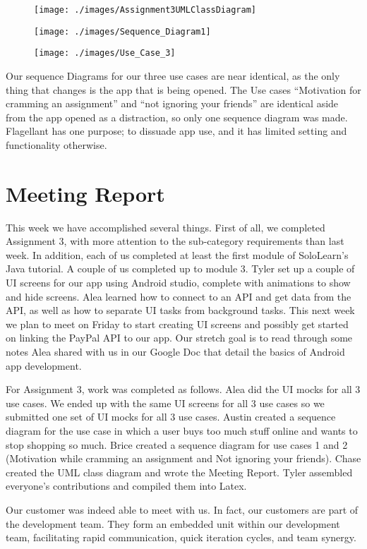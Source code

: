 \documentclass[a4paper]{article}
\begin{document}
\begin{figure}[H]
	\centering
	\texttt{[image: ./images/Assignment3UMLClassDiagram]}
\end{figure}

\begin{figure}[H]
	\centering
	\texttt{[image: ./images/Sequence\_Diagram1]}
\end{figure}

\begin{figure}[H]
	\centering
	\texttt{[image: ./images/Use\_Case\_3]}
\end{figure}

Our sequence Diagrams for our three use cases are near identical, as the only thing that changes is the app that is being opened.  The Use cases “Motivation for cramming an assignment” and “not ignoring your friends” are identical aside from the app opened as a distraction, so only one sequence diagram was made.  Flagellant has one purpose; to dissuade app use, and it has limited setting and functionality otherwise.

\pagebreak    
\section{Meeting Report}

	This week we have accomplished several things. First of all, we completed Assignment 3, with more attention to the sub-category requirements than last week. In addition, each of us completed at least the first module of SoloLearn’s Java tutorial. A couple of us completed up to module 3. Tyler set up a couple of UI screens for our app using Android studio, complete with animations to show and hide screens. Alea learned how to connect to an API and get data from the API, as well as how to separate UI tasks from background tasks.
	This next week we plan to meet on Friday to start creating UI screens and possibly get started on linking the PayPal API to our app. Our stretch goal is to read through some notes Alea shared with us in our Google Doc that detail the basics of Android app development.
    
	For Assignment 3, work was completed as follows. Alea did the UI mocks for all 3 use cases. We ended up with the same UI screens for all 3 use cases so we submitted one set of UI mocks for all 3 use cases. Austin created a sequence diagram for the use case in which a user buys too much stuff online and wants to stop shopping so much. Brice created a sequence diagram for use cases 1 and 2 (Motivation while cramming an assignment and Not ignoring your friends). Chase created the UML class diagram and wrote the Meeting Report. Tyler assembled everyone’s contributions and compiled them into Latex.
    
	Our customer was indeed able to meet with us. In fact, our customers are part of the development team. They form an embedded unit within our development team, facilitating rapid communication, quick iteration cycles, and team synergy. 
\end{document}
